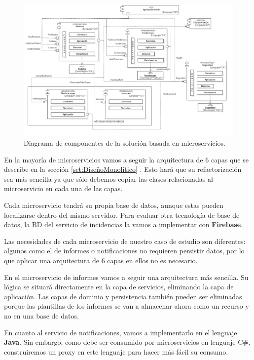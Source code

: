 \documentclass[11pt,spanish,listoffigures]{tfgetsinf}
\begin{document}
\begin{figure}[h]
\centering
\includegraphics[scale=0.35]{Componentes}
\caption{Diagrama de componentes de la solución basada en microservicios.}
\label{fig:Componentes}
\end{figure}

En la mayoría de microservicios vamos a seguir la arquitectura de 6 capas que se describe en la sección \ref{sct:DiseñoMonolitico} . Esto hará que su refactorización sea más sencilla ya que sólo debemos copiar las clases relacionadas al microservicio en cada una de las capas. 

Cada microservicio tendrá su propia base de datos, aunque estas pueden localizarse dentro del mismo servidor. Para evaluar otra tecnología de base de datos, la BD del servicio de incidencias la vamos a implementar con \textbf{Firebase}.

Las necesidades de cada microservicio de nuestro caso de estudio son diferentes: algunos como el de informes o notificaciones no requieren persistir datos, por lo que aplicar una arquitectura de 6 capas en ellos no es necesario. 

En el microservicio de informes vamos a seguir una arquitectura más sencilla. Su lógica se situará directamente en la capa de servicios, eliminando la capa de aplicación. Las capas de dominio y persistencia también pueden ser eliminadas porque las plantillas de los informes se van a almacenar ahora como un recurso y no en una base de datos. 

En cuanto al servicio de notificaciones, vamos a implementarlo en el lenguaje \textbf{Java}. Sin embargo, como debe ser consumido por microservicios en lenguaje C\#, construiremos un proxy en este lenguaje para hacer más fácil su consumo.
\end{document}
